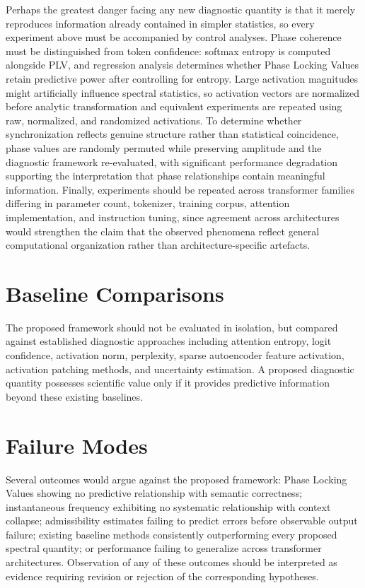 \documentclass[11pt,twoside,openright]{book}
\numberwithin{equation}{chapter}
\theoremstyle{definition}
\theoremstyle{plain}
\theoremstyle{remark}
\theoremstyle{definition}
\begin{document}
Perhaps the greatest danger facing any new diagnostic quantity is that it
merely reproduces information already contained in simpler statistics, so
every experiment above must be accompanied by control analyses. Phase
coherence must be distinguished from token confidence: softmax entropy is
computed alongside PLV, and regression analysis determines whether Phase
Locking Values retain predictive power after controlling for entropy.
Large activation magnitudes might artificially influence spectral
statistics, so activation vectors are normalized before analytic
transformation and equivalent experiments are repeated using raw,
normalized, and randomized activations. To determine whether
synchronization reflects genuine structure rather than statistical
coincidence, phase values are randomly permuted while preserving
amplitude and the diagnostic framework re-evaluated, with significant
performance degradation supporting the interpretation that phase
relationships contain meaningful information. Finally, experiments should
be repeated across transformer families differing in parameter count,
tokenizer, training corpus, attention implementation, and instruction
tuning, since agreement across architectures would strengthen the claim
that the observed phenomena reflect general computational organization
rather than architecture-specific artefacts.

\section{Baseline Comparisons}

The proposed framework should not be evaluated in isolation, but compared
against established diagnostic approaches including attention entropy,
logit confidence, activation norm, perplexity, sparse autoencoder feature
activation, activation patching methods, and uncertainty estimation. A
proposed diagnostic quantity possesses scientific value only if it
provides predictive information beyond these existing baselines.

\section{Failure Modes}

Several outcomes would argue against the proposed framework: Phase
Locking Values showing no predictive relationship with semantic
correctness; instantaneous frequency exhibiting no systematic
relationship with context collapse; admissibility estimates failing to
predict errors before observable output failure; existing baseline
methods consistently outperforming every proposed spectral quantity; or
performance failing to generalize across transformer architectures.
Observation of any of these outcomes should be interpreted as evidence
requiring revision or rejection of the corresponding hypotheses.
\end{document}
